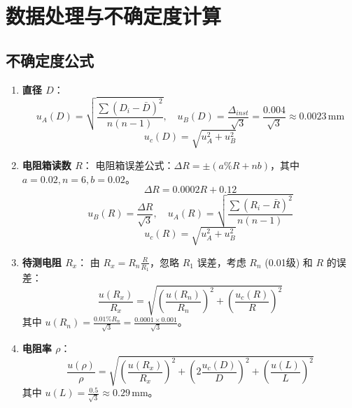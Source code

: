 \documentclass[12pt,a4paper]{article}
\begin{document}
\section{数据处理与不确定度计算}

\subsection{不确定度公式}
\begin{enumerate}
    \item \textbf{直径 $D$}：
    \[ u_A(D) = \sqrt{\frac{\sum(D_i - \bar{D})^2}{n(n-1)}}, \quad u_B(D) = \frac{\Delta_{inst}}{\sqrt{3}} = \frac{0.004}{\sqrt{3}} \approx 0.0023\,\text{mm} \]
    \[ u_c(D) = \sqrt{u_A^2 + u_B^2} \]
    \item \textbf{电阻箱读数 $R$}：
    电阻箱误差公式：$\Delta R = \pm(a\% R + nb)$，其中 $a=0.02, n=6, b=0.02$。
    \[ \Delta R = 0.0002 R + 0.12 \]
    \[ u_B(R) = \frac{\Delta R}{\sqrt{3}}, \quad u_A(R) = \sqrt{\frac{\sum(R_i - \bar{R})^2}{n(n-1)}} \]
    \[ u_c(R) = \sqrt{u_A^2 + u_B^2} \]
    \item \textbf{待测电阻 $R_x$}：
    由 $R_x = R_n \frac{R}{R_1}$，忽略 $R_1$ 误差，考虑 $R_n$ (0.01级) 和 $R$ 的误差：
    \[ \frac{u(R_x)}{R_x} = \sqrt{ \left(\frac{u(R_n)}{R_n}\right)^2 + \left(\frac{u_c(R)}{R}\right)^2 } \]
    其中 $u(R_n) = \frac{0.01\% R_n}{\sqrt{3}} = \frac{0.0001 \times 0.001}{\sqrt{3}}$。
    \item \textbf{电阻率 $\rho$}：
    \[ \frac{u(\rho)}{\rho} = \sqrt{ \left(\frac{u(R_x)}{R_x}\right)^2 + \left(2\frac{u_c(D)}{D}\right)^2 + \left(\frac{u(L)}{L}\right)^2 } \]
    其中 $u(L) = \frac{0.5}{\sqrt{3}} \approx 0.29\,\text{mm}$。
\end{enumerate}
\end{document}
